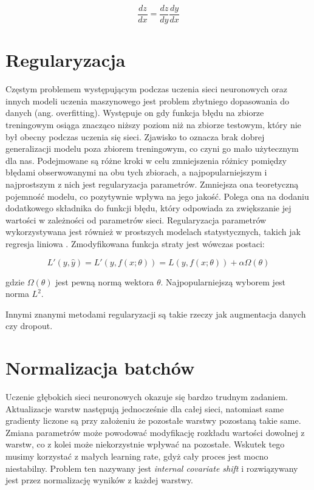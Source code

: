 \documentclass[licencjacka]{pracamgr}
\begin{document}
$$ \frac{dz}{dx} = \frac{dz}{dy} \frac{dy}{dx} $$
 

\section{Regularyzacja}

Częstym problemem występującym podczas uczenia sieci neuronowych oraz innych modeli uczenia maszynowego jest problem zbytniego dopasowania do danych (ang. overfitting). Występuje on gdy funkcja błędu na zbiorze treningowym osiąga znacząco niższy poziom niż na zbiorze testowym, który nie był obecny podczas uczenia się sieci. Zjawisko to oznacza brak dobrej generalizacji modelu poza zbiorem treningowym, co czyni go mało użytecznym dla nas. 
Podejmowane są różne kroki w celu zmniejszenia różnicy pomiędzy błędami obserwowanymi na obu tych zbiorach, a najpopularniejszym i najprostszym z nich jest regularyzacja parametrów. Zmniejsza ona teoretyczną pojemność modelu, co pozytywnie wpływa na jego jakość. Polega ona na dodaniu dodatkowego składnika do funkcji błędu, który odpowiada za zwiększanie jej wartości w zależności od parametrów sieci. Regularyzacja parametrów wykorzystywana jest również w prostszych modelach statystycznych, takich jak regresja liniowa \cite{lasso, ridge}. Zmodyfikowana funkcja straty jest wówczas postaci:

$$ L'(y, \hat{y}) = L'(y, f(x; \theta)) = L(y, f(x; \theta)) + \alpha \Omega(\theta) $$

gdzie $ \Omega(\theta) $ jest pewną normą wektora $ \theta $. Najpopularniejszą wyborem jest norma $ L^2 $.

Innymi znanymi metodami regularyzacji są takie rzeczy jak augmentacja danych czy dropout.

\section{Normalizacja batchów}

Uczenie głębokich sieci neuronowych okazuje się bardzo trudnym zadaniem. Aktualizacje warstw następują jednocześnie dla całej sieci, natomiast same gradienty liczone są przy założeniu że pozostałe warstwy pozostaną takie same. Zmiana parametrów może powodować modyfikację rozkładu wartości dowolnej z warstw, co z kolei może niekorzystnie wpływać na pozostałe. Wskutek tego musimy korzystać z małych learning rate, gdyż cały proces jest mocno niestabilny. Problem ten nazywany jest \emph{internal covariate shift} i rozwiązywany jest przez normalizację wyników z każdej warstwy. 
\end{document}
